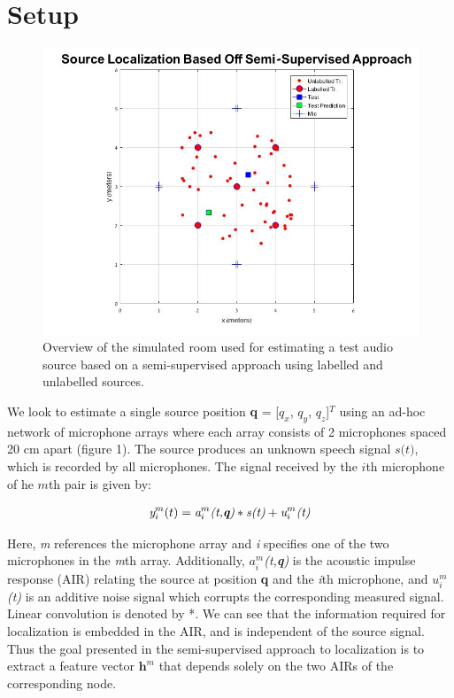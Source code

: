 \documentclass{article}
\begin{document}
\section{Setup}

\begin{figure}[htbp]
\centering
\includegraphics[width=0.6\linewidth]{figures/environment_overview.jpg}
\caption[Source Localization Based Off Semi-Supervised Approach]{Overview of the simulated room used for estimating a test audio source based on a semi-supervised approach using labelled and unlabelled sources.}
\label{fig:room_overview}
\end{figure}

We look to estimate a single source position \textbf{q} = [\textit{$q_x$}, \textit{$q_y$}, \textit{$q_z$}]$^T$ using an ad-hoc network of microphone arrays where each array consists of 2 microphones spaced 20 cm apart (figure 1). The source produces an unknown speech signal $\textit{s(t)}$, which is recorded by all microphones. The signal received by the $\textit{i}$th microphone of he $\textit{m}$th pair is given by: 

\begin{equation} \label{source_eqn}
    \begin{aligned}
        \textit{{y}$_i^m(t)$} = \textit{{a}$_i^m$(t,\textbf{q})} * \textit{s(t)} + \textit{{u}$_i^m$(t)}
    \end{aligned}
\end{equation}

Here, \textit{m} references the microphone array and \textit{i} specifies one of the two microphones in the \textit{m}th array. Additionally, \textit{${a}_i^m$(t,\textbf{q})} is the acoustic impulse response (AIR) relating the source at position \textbf{q} and the \textit{i}th microphone, and \textit{${u}_i^m$(t)} is an additive noise signal which corrupts the corresponding measured signal. Linear convolution is denoted by *. We can see that the information required for localization is embedded in the AIR, and is independent of the source signal. Thus the goal presented in the semi-supervised approach to localization is to extract a feature vector $\textbf{h}^\textit{m}$ that depends solely on the two AIRs of the corresponding node. 
\end{document}
